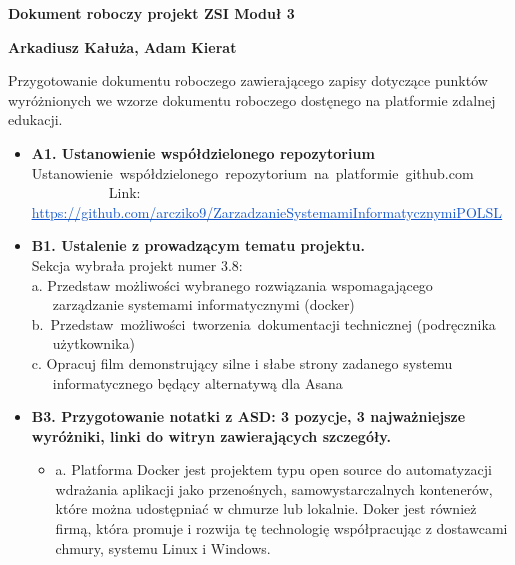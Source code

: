 \documentclass[12pt]{article}
\renewcommand{\_}{\kern-1.5pt\textunderscore\kern-1.5pt}
\begin{document}
\textbf{Dokument roboczy projekt ZSI Moduł 3}\par


\vspace{\baselineskip}
\textbf{Arkadiusz Kałuża, Adam Kierat}\par


\vspace{\baselineskip}
Przygotowanie dokumentu roboczego zawierającego zapisy dotyczące punktów wyróżnionych we wzorze dokumentu roboczego dostęnego na platformie zdalnej edukacji.\par


\vspace{\baselineskip}
\begin{itemize}
	\item \textbf{A1. Ustanowienie współdzielonego repozytorium}\\
Ustanowienie\ współdzielonego\ repozytorium\ na\ platformie\ github.com\ \ \ \ \ \ \ \ \ \ \ \ \ \ \ \       Link: \href{https://github.com/arcziko9/ZarzadzanieSystemamiInformatycznymiPOLSL}{\textcolor[HTML]{1155CC}{\ul{https://github.com/arcziko9/ZarzadzanieSystemamiInformatycznymiPOLSL}}}\\
\par

	\item \textbf{B1. Ustalenie z prowadzącym tematu projektu.}\\
Sekcja wybrała projekt numer 3.8:\\
 \tab a. Przedstaw możliwości wybranego rozwiązania wspomagającego \tab \tab \ \ \  zarządzanie systemami informatycznymi (docker)\\
 \tab b.\ Przedstaw\ możliwości\ tworzenia\ dokumentacji technicznej (podręcznika     \tab \ \ \  użytkownika)\\
 \tab c. Opracuj film demonstrujący silne i słabe strony zadanego systemu \tab \tab \ \ \  informatycznego będący alternatywą dla Asana\\
\par

	\item \textbf{B3. Przygotowanie notatki z ASD: 3 pozycje, 3 najważniejsze wyróżniki, linki do witryn zawierających szczegóły.}\par

\begin{itemize}
	\item a. Platforma Docker jest projektem typu open source do automatyzacji wdrażania aplikacji jako przenośnych, samowystarczalnych kontenerów, które można udostępniać w chmurze lub lokalnie. Doker jest również firmą, która promuje i rozwija tę technologię współpracując z dostawcami chmury, systemu Linux i Windows.\par


\end{itemize}
\end{itemize}
\end{document}
